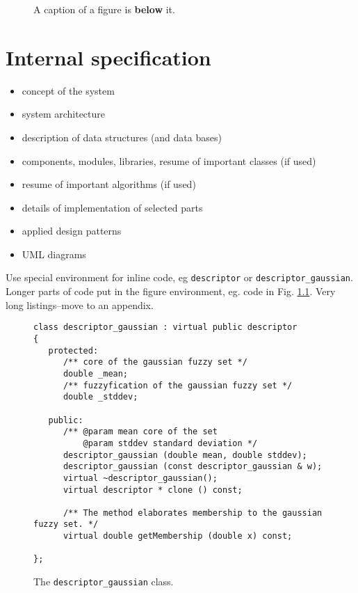 \documentclass[a4paper,twoside,12pt]{book}
\begin{document}
\begin{figure}
\centering
{}
\caption{A caption of a figure is \textbf{below} it.}
\label{fig:2}
\end{figure}


\chapter{Internal specification}

\begin{itemize}
\item concept of the system
\item system architecture
\item description of data structures (and data bases)
\item components, modules, libraries, resume of important classes (if used)
\item resume of important algorithms (if used)
\item details of implementation of selected parts
\item applied design patterns
\item UML diagrams
\end{itemize}


Use special environment for inline code, eg \lstinline|descriptor| or \lstinline|descriptor_gaussian|.
Longer parts of code put in the figure environment, eg. code in Fig. \ref{fig:pseudokod}. Very long listings–move to an appendix.

\begin{figure}
\centering
\begin{lstlisting}
class descriptor_gaussian : virtual public descriptor
{
   protected:
      /** core of the gaussian fuzzy set */
      double _mean;
      /** fuzzyfication of the gaussian fuzzy set */
      double _stddev;

   public:
      /** @param mean core of the set
          @param stddev standard deviation */
      descriptor_gaussian (double mean, double stddev);
      descriptor_gaussian (const descriptor_gaussian & w);
      virtual ~descriptor_gaussian();
      virtual descriptor * clone () const;

      /** The method elaborates membership to the gaussian fuzzy set. */
      virtual double getMembership (double x) const;

};
\end{lstlisting}
\caption{The \lstinline|descriptor_gaussian| class.}
\label{fig:pseudokod}
\end{figure}
\end{document}

